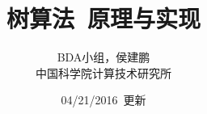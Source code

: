 \documentclass[a4paper,11pt,         %
               ]{article}
\begin{document}
\newcommand{\song}{\CJKfamily{song}} %
\newcommand{\hei}{\CJKfamily{hei}}   %
\newcommand{\fs}{\CJKfamily{fs}}     %
\newcommand{\kai}{\CJKfamily{kai}}   %

\newtheorem{example}{例}             %
\newtheorem{theorem}{定理}[section]  %
\newtheorem{definition}{定义}
\newtheorem{axiom}{公理}
\newtheorem{property}{性质}
\newtheorem{proposition}{命题}
\newtheorem{lemma}{引理}
\newtheorem{corollary}{推论}
\newtheorem{remark}{注解}
\newtheorem{condition}{条件}
\newtheorem{conclusion}{结论}
\newtheorem{assumption}{假设}

\renewcommand{\contentsname}{目录}     %
\renewcommand{\abstractname}{摘\ \ 要} %
\renewcommand{\refname}{参考文献}      %
\renewcommand{\indexname}{索引}
\renewcommand{\figurename}{图}
\renewcommand{\tablename}{表}
\renewcommand{\appendixname}{附录}
\renewcommand{\proofname}{\hei 证明}

\newcommand{\yihao}{\fontsize{26pt}{36pt}\selectfont}       %
\newcommand{\erhao}{\fontsize{22pt}{28pt}\selectfont}       %
\newcommand{\xiaoer}{\fontsize{18pt}{18pt}\selectfont}      %
\newcommand{\sanhao}{\fontsize{16pt}{24pt}\selectfont}      %
\newcommand{\xiaosan}{\fontsize{15pt}{22pt}\selectfont}     %
\newcommand{\sihao}{\fontsize{14pt}{21pt}\selectfont}       %
\newcommand{\bansi}{\fontsize{13pt}{19.5pt}\selectfont}     %
\newcommand{\xiaosi}{\fontsize{12pt}{18pt}\selectfont}      %
\newcommand{\dawu}{\fontsize{11pt}{11pt}\selectfont}        %
\newcommand{\wuhao}{\fontsize{10.5pt}{10.5pt}\selectfont}   %

\newcommand{\tabincell}[2]{\begin{tabular}{@{}#1@{}}#2\end{tabular}}

\rfoot{~\thepage~}

\title{树算法~原理与实现}
\author{BDA小组，侯建鹏\\                     %
        中国科学院计算技术研究所}
\date{04/21/2016~更新}                %
\maketitle                           %
\tableofcontents                     %
\thispagestyle{empty}                %
\end{document}
